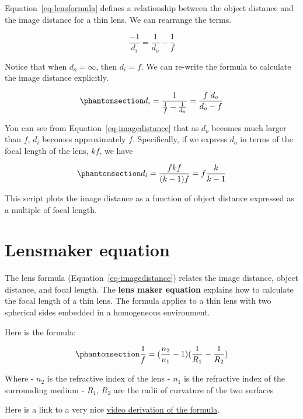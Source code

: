 \documentclass[
  letterpaper,
]{book}
\begin{document}
Equation~\ref{eq-lensformula} defines a relationship between the object
distance and the image distance for a thin lens. We can rearrange the
terms.

\[
\frac{-1}{d_i} = \frac{1}{d_o} - \frac{1}{f}
\]

Notice that when \(d_o = \infty\), then \(d_i = f\). We can re-write the
formula to calculate the image distance explicitly.

\begin{equation}\phantomsection\label{eq-imagedistance}{
d_i = \frac{1}{\frac{1}{f} - \frac{1}{d_o}} = \frac{f~d_o}{d_o - f} 
}\end{equation}

You can see from Equation~\ref{eq-imagedistance} that as \(d_o\) becomes
much larger than \(f\), \(d_i\) becomes approximately \(f\).
Specifically, if we express \(d_o\) in terms of the focal length of the
lens, \(k f\), we have

\begin{equation}\phantomsection\label{eq-imagedistance}{
d_i = \frac{f k f}{(k-1) f} = f \frac{k}{k-1}
}\end{equation}

This script plots the image distance as a function of object distance
expressed as a multiple of focal length.

\section{Lensmaker equation}\label{sec-optics-lensmaker}

The lens formula (Equation~\ref{eq-imagedistance}) relates the image
distance, object distance, and focal length. The \textbf{lens maker
equation} explains how to calculate the focal length of a thin lens. The
formula applies to a thin lens with two spherical sides embedded in a
homogeneous environment.

Here is the formula:

\begin{equation}\phantomsection\label{eq-lensmaker}{
\frac{1}{f} = (\frac{n_2}{n_1} - 1) ( \frac{1}{R_1} - \frac{1}{R_2}) 
}\end{equation}

Where - \(n_2\) is the refractive index of the lens - \(n_1\) is the
refractive index of the surrounding medium - \(R_1\), \(R_2\) are the
radii of curvature of the two surfaces

Here is a link to a very nice
\href{https://www.khanacademy.org/science/in-in-class-12th-physics-india/in-in-ray-optics-and-optical-instruments/in-in-refraction-in-thin-lenses/v/lens-makers-formula}{video
derivation of the formula}.
\end{document}
